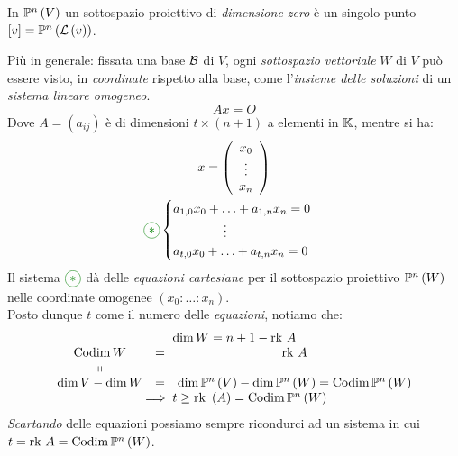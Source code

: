 \begin{attention}
	In $\proj{V}$ un sottospazio proiettivo di \textit{dimensione zero} è un singolo punto $\left[v\right]=\proj{\lin{v}}$.
\end{attention}
Più in generale: fissata una base $\mathcal{B}$ di $V$, ogni \textit{sottospazio vettoriale} $W$ di $V$ può essere visto, in \textit{coordinate} rispetto alla base, come l'\textit{insieme delle soluzioni} di un \textit{sistema lineare omogeneo}.
\begin{equation*}
	Ax=O
\end{equation*}
Dove $A=\left(a_{ij}\right)$ è di dimensioni $t\times \left(n+1\right)$ a elementi in $\mathbb{K}$, mentre si ha:
\begin{gather}
	x=\left(\begin{array}{c}
		x_0 \\
		\vdots \\
		x_n
	\end{array}\right)\\
\textcolor{green}{\circled{\ast}}\begin{cases}
	a_{1,0}x_0+\ldots+a_{1,n}x_n=0\\
	\qquad\qquad\vdots\\
	a_{t,0}x_0+\ldots+a_{t,n}x_n=0\\
\end{cases}
\end{gather}
Il sistema $\textcolor{green}{\circled{\ast}}$ dà delle \textit{equazioni cartesiane} per il sottospazio proiettivo $\proj{W}$ nelle coordinate omogenee $\left(x_0\colon\ldots\colon x_n\right)$.\\
Posto dunque $t$ come il numero delle \textit{equazioni}, notiamo che:
\begin{equation*}
	\begin{array}{cc}
		\dim W=n+1-\rk A \\
\begin{array}{ccc}
	\codim W &=&\rk A \\
	\shortparallel &  \\
	\dim V-\dim W &=&\dim\proj{V}-\dim\proj{W}=\codim\proj{W}
\end{array}\\
	\implies t\geq \rk\left(A\right)=\codim\proj{W}
	\end{array}
\end{equation*}
\textit{Scartando} delle equazioni possiamo sempre ricondurci ad un sistema in cui $t=\rk A=\codim\proj{W}$.
